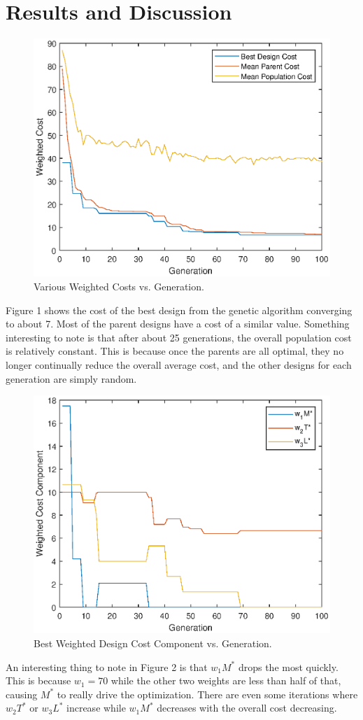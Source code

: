 \documentclass[a4paper,12pt]{report}
\begin{document}
\section{Results and Discussion}
\begin{figure}[H]
\begin{nscenter}
  \includegraphics[width=0.5\linewidth]{results1.eps}
  \caption{Various Weighted Costs vs. Generation.}
  \end{nscenter}
\end{figure}
Figure 1 shows the cost of the best design from the genetic algorithm converging to about 7. Most of the parent designs have a cost of a similar value. Something interesting to note is that after about 25 generations, the overall population cost is relatively constant. This is because once the parents are all optimal, they no longer continually reduce the overall average cost, and the other designs for each generation are simply random.
\begin{figure}[H]
\begin{nscenter}
  \includegraphics[width=0.5\linewidth]{results2a.eps}
  \caption{Best Weighted Design Cost Component vs. Generation.}
    \end{nscenter}
\end{figure}
\noindent
An interesting thing to note in Figure 2 is that $w_1M^*$ drops the most quickly. This is because $w_1 = 70$ while the other two weights are less than half of that, causing $M^*$ to really drive the optimization. There are even some iterations where $w_2T^*$ or $w_3L^*$ increase while $w_1M^*$ decreases with the overall cost decreasing.
\end{document}
